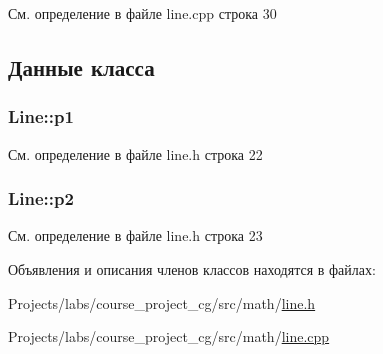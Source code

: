 См. определение в файле line.\+cpp строка 30



\subsection{Данные класса}
\subsubsection[{\texorpdfstring{p1}{p1}}]{ Line\+::p1\hspace{0.3cm}{\ttfamily [private]}}\hypertarget{class_line_a165376d8bc780a0b0ec7ffe8cd0d700a}{}\label{class_line_a165376d8bc780a0b0ec7ffe8cd0d700a}


См. определение в файле line.\+h строка 22

\subsubsection[{\texorpdfstring{p2}{p2}}]{ Line\+::p2\hspace{0.3cm}{\ttfamily [private]}}\hypertarget{class_line_a21d0f4b2e7252e222e9d32921ea0162c}{}\label{class_line_a21d0f4b2e7252e222e9d32921ea0162c}


См. определение в файле line.\+h строка 23



Объявления и описания членов классов находятся в файлах\+:\begin{DoxyCompactItemize}
\item 
Projects/labs/course\+\_\+project\+\_\+cg/src/math/\hyperlink{line_8h}{line.\+h}\item 
Projects/labs/course\+\_\+project\+\_\+cg/src/math/\hyperlink{line_8cpp}{line.\+cpp}\end{DoxyCompactItemize}
